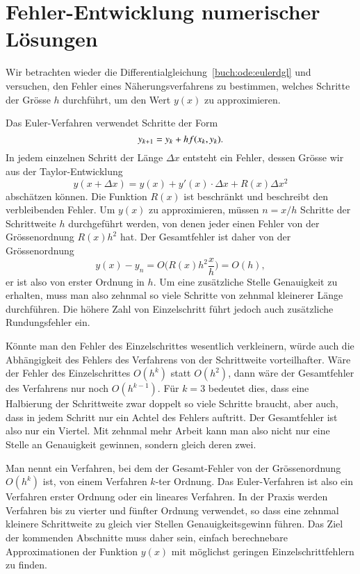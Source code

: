 %
%
%
\section{Fehler-Entwicklung numerischer Lösungen}
Wir betrachten wieder die Differentialgleichung~\eqref{buch:ode:eulerdgl}
und versuchen, den Fehler eines Näherungsverfahrens zu bestimmen,
welches Schritte der Grösse $h$ durchführt, um den Wert $y(x)$
zu approximieren.

Das Euler-Verfahren verwendet Schritte der Form
\[
y_{k+1}=y_{k\mathstrut} + hf(x_{k\mathstrut},y_{k\mathstrut}).
\]
In jedem einzelnen Schritt der Länge $\Delta x$
entsteht ein Fehler, dessen Grösse wir
aus der Taylor-Entwicklung
\[
y(x+\Delta x)
=
y(x) + y'(x)\cdot \Delta x + R(x) \Delta x^2
\]
abschätzen können.
Die Funktion $R(x)$ ist beschränkt und beschreibt den verbleibenden
Fehler.
Um $y(x)$ zu approximieren, müssen $n=x/h$ Schritte der Schrittweite
$h$ durchgeführt werden, von denen jeder einen Fehler
von der Grössenordnung $R(x)h^2$ hat.
Der Gesamtfehler ist daher von der Grössenordnung
\[
y(x)-y_n=O\biggl(R(x)h^2\frac{x}h\biggr)=O(h),
\]
er ist also von erster Ordnung in $h$.
Um eine zusätzliche Stelle Genauigkeit zu erhalten, muss man also zehnmal
so viele Schritte von zehnmal kleinerer Länge durchführen.
Die höhere Zahl von Einzelschritt führt jedoch 
auch zusätzliche Rundungsfehler ein.

Könnte man den Fehler des Einzelschrittes wesentlich verkleinern, würde
auch die Abhängigkeit des Fehlers des Verfahrens von der Schrittweite
vorteilhafter.
Wäre der Fehler des Einzelschrittes $O(h^k)$ statt $O(h^2)$, dann
wäre der Gesamtfehler des Verfahrens nur noch $O(h^{k-1})$.
Für $k=3$ bedeutet dies, dass eine Halbierung der Schrittweite
zwar doppelt so viele Schritte braucht, aber auch, dass in jedem
Schritt nur ein Achtel des Fehlers auftritt.
Der Gesamtfehler ist also nur ein Viertel.
Mit zehnmal mehr Arbeit kann man also nicht nur eine Stelle an
Genauigkeit gewinnen, sondern gleich deren zwei.

Man nennt ein Verfahren, bei dem der Gesamt-Fehler von der Grössenordnung
$O(h^k)$ ist, von einem Verfahren $k$-ter Ordnung.
%
Das Euler-Verfahren ist also ein Verfahren erster Ordnung oder ein
lineares Verfahren.
In der Praxis werden Verfahren bis zu vierter und fünfter Ordnung
verwendet, so dass eine zehnmal kleinere Schrittweite zu gleich
vier Stellen Genauigkeitsgewinn führen.
Das Ziel der kommenden Abschnitte muss daher sein, einfach
berechnebare Approximationen der Funktion $y(x)$ mit möglichst geringen
Einzelschrittfehlern zu finden.

